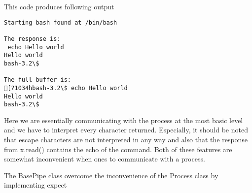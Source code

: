 \documentclass[letterpaper,10pt,english]{sphinxmanual}
\begin{document}
This code produces following output

\begin{Verbatim}[commandchars=\\\{\}]
Starting bash found at /bin/bash

The response is:
 echo Hello world
Hello world
bash-3.2\$ 

The full buffer is:
[?1034hbash-3.2\$ echo Hello world
Hello world
bash-3.2\$
\end{Verbatim}

Here we are essentially communicating with the process at the most basic
level and we have to interpret every character returned. Especially, it
should be noted that escape characters are not interpreted in any way
and also that the response from x.read() contains the echo of the
command. Both of these features are somewhat inconvenient when ones to
communicate with a process.

The BasePipe class overcome the inconvenience of the Process class by
implementing expect
\end{document}
